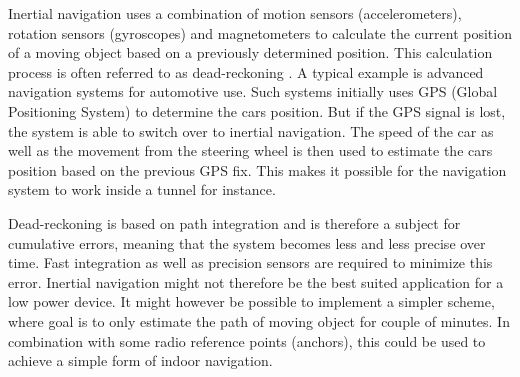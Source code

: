 Inertial navigation uses a combination of motion sensors (accelerometers), rotation sensors (gyroscopes) and magnetometers to calculate the current position of a moving object based on a previously determined position. This calculation process is often referred to as dead-reckoning \cite{dead_reckoning}. A typical example is advanced navigation systems for automotive use. Such systems initially uses GPS (Global Positioning System) to determine the cars position. But if the GPS signal is lost, the system is able to switch over to inertial navigation. The speed of the car as well as the movement from the steering wheel is then used to estimate the cars position based on the previous GPS fix. This makes it possible for the navigation system to work inside a tunnel for instance. 

Dead-reckoning is based on path integration and is therefore a subject for cumulative errors, meaning that the system becomes less and less precise over time. Fast integration as well as precision sensors are required to minimize this error. Inertial navigation might not therefore be the best suited application for a low power device. It might however be possible to implement a simpler scheme, where goal is to only estimate the path of moving object for couple of minutes. In combination with some radio reference points (anchors), this could be used to achieve a simple form of indoor navigation.  